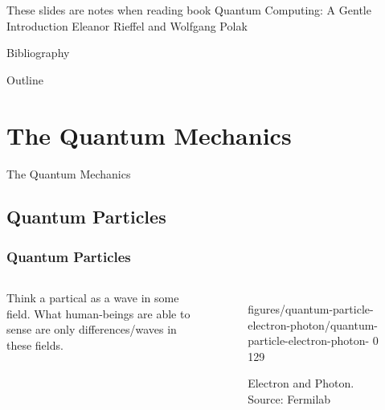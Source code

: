 \documentclass{beamer}
\begin{document}
\def\gtwo#1{\gnqubit{#1}{d}}

\def\gthree#1{\gnqubit{#1}{dd}}


\def\dmeterwide#1#2{*{\xy <0pt,-8pt>;<0pt,8pt> **@{-};
		    <0pt,-8pt>;<#2,-8pt> **@{-} ;
		    <0pt, 8pt>;<#2, 8pt> **@{-} ;
		    <#2,0pt>-<5pt,0pt>*{#1} ;
		    <#2,0pt>*\cir<8pt>{r_l}\endxy}}

\def\dmeter#1{\dmeterwide{#1}{12pt}}



\begin{frame}
  \titlepage
\end{frame}

\begin{frame}
  These slides are notes when reading book
  \newline
  \newline
  \LARGE{\textrm{Quantum Computing: A Gentle Introduction}}\tiny\cite{gentleintroduction}
  \newline
  \newline
  \small{\textrm{Eleanor Rieffel and Wolfgang Polak}}
\end{frame}

\begin{frame}{Bibliography}
  \AtNextBibliography{\tiny}
  \printbibliography
\end{frame}

\begin{frame}[t,allowframebreaks]{Outline}
  \tableofcontents
\end{frame}

\section{The Quantum Mechanics}
\begin{frame}
  The Quantum Mechanics
\end{frame}

\subsection{Quantum Particles}
\begin{frame}
  \frametitle{Quantum Particles}
  \begin{columns}
    Think a partical as a wave in some field.
    What human-beings are able to sense are only differences/waves in these fields.\tiny\cite{quantumparticle}
    \begin{figure}
      {figures/quantum-particle-electron-photon/quantum-particle-electron-photon-}
      {0}
      {129}
      \caption{Electron and Photon. Source: Fermilab}
    \end{figure}
  \end{columns}
\end{frame}
\end{document}
